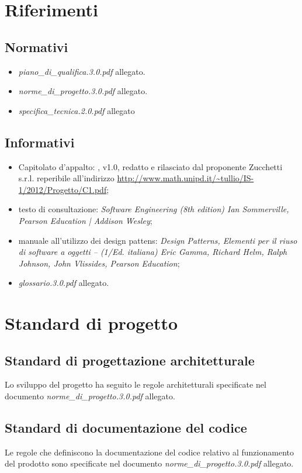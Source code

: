 \section{Riferimenti}
\subsection{Normativi}
\begin{itemize}
\item[] \textit{piano\_di\_qualifica.3.0.pdf} allegato.
\item[] \textit{norme\_di\_progetto.3.0.pdf} allegato.
\item[] \textit{specifica\_tecnica.2.0.pdf} allegato
\end{itemize}

\subsection{Informativi}
\begin{itemize}
\item[] Capitolato d'appalto: \caName{}, v1.0, redatto e rilasciato dal proponente Zucchetti s.r.l. reperibile all'indirizzo \url{http://www.math.unipd.it/~tullio/IS-1/2012/Progetto/C1.pdf};
\item[] testo di consultazione: \textit{Software Engineering (8th edition) Ian Sommerville, Pearson Education | Addison Wesley};
\item[] manuale all'utilizzo dei design pattens: \textit{Design Patterns, Elementi per il riuso di software a oggetti -- (1/Ed. italiana) Eric Gamma, Richard Helm, Ralph Johnson, John Vlissides, Pearson Education};
\item[] \textit{glossario.3.0.pdf} allegato.
\end{itemize}
\clearpage

\section{Standard di progetto}

\subsection{Standard di progettazione architetturale}
Lo sviluppo del progetto ha seguito le regole architetturali specificate nel documento  \textit{norme\_di\_progetto.3.0.pdf} allegato.

\subsection{Standard di documentazione del codice}
Le regole che definiscono la documentazione del codice relativo al funzionamento del prodotto sono specificate nel documento \textit{norme\_di\_progetto.3.0.pdf} allegato.

